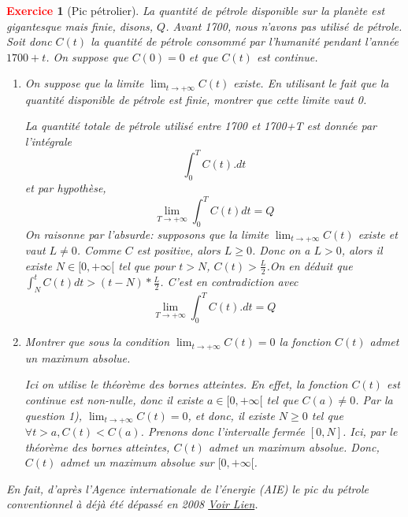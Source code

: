 \documentclass[11pt]{article}
\theoremstyle{mythmstyle}
\newtheorem{exo}{\textcolor{red}{\textbf{Exercice}}}
\begin{document}
\begin{exo}[Pic pétrolier]
La quantité de pétrole disponible sur la planète est gigantesque mais finie, disons, $Q$. Avant 1700, nous n'avons pas utilisé de pétrole. Soit  donc  $C(t)$ la quantité de pétrole consommé  par l'humanité pendant l'année $1700+t$. On suppose que  $C(0)=0$ et que $C(t)$ est continue.
\begin{enumerate}
    \item On suppose que la limite $\lim_{t\to +\infty} C(t)$ existe. En utilisant le fait que la quantité disponible de pétrole est finie, montrer que cette limite vaut 0.
   
   
  \begin{solution}
  La quantité totale de pétrole utilisé entre 1700 et 1700+T est donnée par l'intégrale
    $$
    \int_{0}^T C(t).dt
    $$
    et par hypothèse, 
    $$
    \lim_{T\to +\infty}\int_{0}^T C(t)dt=Q
    $$
    On raisonne par l'absurde:
 supposons que la limite $\lim_{t\to +\infty} C(t)$ existe et  vaut $L \neq 0$. Comme $C$ est positive, alors $L\geq 0$. Donc on a $L>0$, alors il existe $N\in [0, +\infty[$ tel que pour $t>N$, $C(t)>\frac L2$.On en déduit que $\int_{N}^{t}C(t)dt> (t-N)*\frac L2$. C'est en contradiction avec  $$
    \lim_{T\to +\infty}\int_{0}^T C(t).dt=Q
    $$
\end{solution}
    
    
 \item Montrer que sous la condition $\lim_{t\to +\infty} C(t)=0$ la fonction $C(t)$ admet un maximum absolue.
 
\begin{solution}
  Ici on utilise le théorème des bornes atteintes. En effet, la fonction $C(t)$ est continue est non-nulle, donc il existe $a\in [0, +\infty[$ tel que $C(a)\neq 0$. Par la question 1), $\lim_{t\to +\infty} C(t)=0$, et donc, il existe $N\geq 0$ tel que $\forall t> a, C(t)< C(a)$. Prenons donc l'intervalle fermée $[0, N]$. Ici, par le théorème des bornes atteintes, $C(t)$ admet un maximum absolue. Donc, $C(t)$ admet un maximum absolue sur $[0, +\infty[$.
\end{solution}
 
  \end{enumerate}  
  
  
\medskip
En fait, d'après l’Agence internationale de l’énergie (AIE)  le pic du pétrole conventionnel à déjà été dépassé en 2008 \href{https://www.lemonde.fr/blog/petrole/2019/02/04/pic-petrolier-probable-dici-a-2025-selon-lagence-internationale-de-lenergie/}{Voir Lien}.
\end{exo}
  
\end{document}
